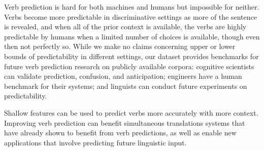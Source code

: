 



Verb prediction is hard for both machines and humans but impossible
for neither.  Verbs become more predictable in discriminative settings
as more of the sentence is revealed, and when all of the prior context
is available, the verbs are highly predictable by humans when a
limited number of choices is available, though even then not perfectly
so.  While we make no claims concerning upper or lower bounds of
predictability in different settings, our dataset provides benchmarks
for future verb prediction research on publicly available corpora:
cognitive scientists can validate prediction, confusion, and
anticipation; engineers have a human benchmark for their systems; and
linguists can conduct future experiments on predictability.




Shallow features can be used to predict verbs more accurately with
more context. Improving verb prediction can benefit simultaneous
translations systems that have already shown to benefit from verb
predictions, as well as enable new applications that involve
predicting future linguistic input.
